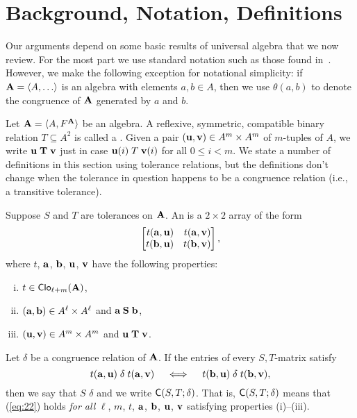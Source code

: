 \section{Background, Notation, Definitions}
\label{sec:definitions}
Our arguments depend on some basic results of universal algebra that we now review.
For the most part we use standard notation such as those found in~\cite{MR2839398}.
However, we make the following exception for notational simplicity:
if $\bA =\<A, \dots\>$ is an algebra with elements 
$a, b \in A$, then we use $\theta(a,b)$ to denote
the congruence of $\mathbf{A}$ generated by $a$ and $b$.

\renewcommand{\Cg}{\ensuremath{\theta}}

Let $\mathbf{A} = \langle A, F^{\mathbf{A}}\rangle$ be an algebra.
A reflexive, symmetric, compatible binary relation $T\subseteq A^2$ is called a
.  
Given a pair $(\mathbf{u}, \mathbf{v}) \in A^m\times A^m$ of $m$-tuples of $A$, we write 
$\mathbf{u} \mathrel{\mathbf{T}} \mathbf{v}$ just in case $\mathbf{u}(i) \mathrel{T} \mathbf{v}(i)$ for all $0\leq i<m$. 
We state a number of definitions in this section using tolerance relations, but 
the definitions don't change when the tolerance in question happens to be
a congruence relation (i.e., a transitive tolerance).

Suppose $S$ and $T$ are tolerances on $\mathbf{A}$.  An  
is a $2\times 2$ array of the form
\[
\begin{bmatrix*}[r] t(\ba,\bu) & t(\ba,\bv)\\ t(\bb,\bu)&t(\bb,\bv)\end{bmatrix*},
\]
where $t$, $\mathbf{a}$, $\mathbf{b}$, $\mathbf{u}$, $\mathbf{v}$ have the following properties:
\begin{enumerate}[(i)] %
\item $t\in \operatorname{\mathsf{Clo}}_{\ell + m}(\mathbf{A})$,
\item $(\mathbf{a}, \mathbf{b})\in A^\ell\times A^\ell$ and $\mathbf{a} \mathrel{\mathbf{S}} \mathbf{b}$,
\item $(\mathbf{u}, \mathbf{v})\in A^m\times A^m$ and $\mathbf{u} \mathrel{\mathbf{T}} \mathbf{v}$.
\end{enumerate}
Let $\delta$ be a congruence relation of $\mathbf{A}$.
If the entries of every $S,T$-matrix satisfy
\begin{equation}
  \label{eq:22}
t(\ba,\bu) \mathrel{\delta} t(\ba,\bv)\quad \iff \quad t(\bb,\bu) \mathrel{\delta} t(\bb,\bv),
\end{equation}
then we say that $S$  $\delta$ and we write 
$\mathsf{C}(S, T; \delta)$.
That is, $\mathsf{C}(S, T; \delta)$  means that 
(\ref{eq:22}) holds \emph{for all}
$\ell$, $m$, $t$, $\mathbf{a}$, $\mathbf{b}$, $\mathbf{u}$, $\mathbf{v}$ satisfying properties (i)--(iii).

